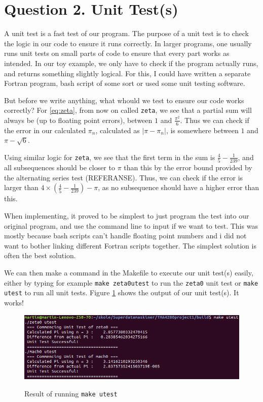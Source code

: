 \documentclass[12pt]{article}
\begin{document}
\section{Question 2. Unit Test(s)}
A unit test is a fast test of our program. The purpose of a 
unit test is to check the logic in our code to ensure it runs correctly.
In larger programs, one usually runs unit tests on small parts of code
to ensure that every part works as intended. In our toy example, we only
have to check if the program actually runs, and returns something slightly logical.
For this, I could have written a separate Fortran program, bash script of some sort or used some unit testing software.

But before we write anything, what whould we test to ensure our code works correctly? For \eqref{eq:zeta}, from now on called \texttt{zeta},
we see that a partial sum will always be (up to floating point errors), between $1$ and
$\frac{\pi^2}{6}$. Thus we can check if the error in our calculated $\pi_n$, calculated as $|\pi - \pi_n|$, is somewhere between $1$ and $\pi - \sqrt{6}$.

Using similar logic for \texttt{zeta},
we see that the first term in the sum is $\frac{4}{5} - \frac{1}{239}$, and all subsequences should be closer to $\pi$ than this by the error bound provided by the
alternating series test (REFERANSE). Thus, we can check if the error is larger than $4 \times(\frac{4}{5} - \frac{1}{239}) - \pi$, as no subsequence should have a higher error than this.  

When implementing, it proved to be simplest to just program the test into our original program, and use the command line to input if we want to test. This was mostly because bash scripts can't
handle floating point numbers and i did not want to bother linking different Fortran scripts together. The simplest solution is often the best solution.

We can then make a command in the Makefile to execute our unit test(s) easily, either by typing for example \texttt{make zeta0utest} to run the \texttt{zeta0} unit test or
\texttt{make utest} to run all unit tests. Figure \ref{fig:Q2} shows the output of our unit test(s). It works! 
\begin{figure}[!htb]
    \centering
    \caption{Result of running \texttt{make utest}}
    \includegraphics[width=\textwidth]{Screenshot2}
    \label{fig:Q2}
\end{figure}
\end{document}
